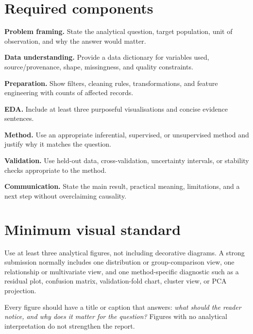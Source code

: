 \section{Required components}
\begin{utpsteps}
  \item \textbf{Problem framing.} State the analytical question, target population, unit of observation, and why the answer would matter.
  \item \textbf{Data understanding.} Provide a data dictionary for variables used, source/provenance, shape, missingness, and quality constraints.
  \item \textbf{Preparation.} Show filters, cleaning rules, transformations, and feature engineering with counts of affected records.
  \item \textbf{EDA.} Include at least three purposeful visualisations and concise evidence sentences.
  \item \textbf{Method.} Use an appropriate inferential, supervised, or unsupervised method and justify why it matches the question.
  \item \textbf{Validation.} Use held-out data, cross-validation, uncertainty intervals, or stability checks appropriate to the method.
  \item \textbf{Communication.} State the main result, practical meaning, limitations, and a next step without overclaiming causality.
\end{utpsteps}


\section{Minimum visual standard}
Use at least three analytical figures, not including decorative diagrams. A strong submission normally includes one distribution or group-comparison view, one relationship or multivariate view, and one method-specific diagnostic such as a residual plot, confusion matrix, validation-fold chart, cluster view, or PCA projection.

Every figure should have a title or caption that answers: \emph{what should the reader notice, and why does it matter for the question?} Figures with no analytical interpretation do not strengthen the report.


